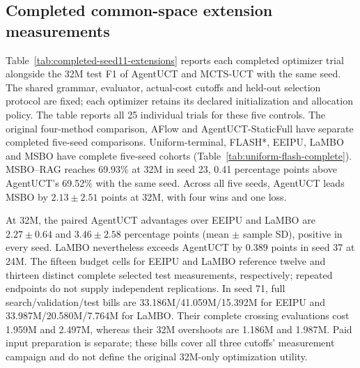 \subsection{Completed common-space extension measurements}
Table~\ref{tab:completed-seed11-extensions} reports each completed optimizer
trial alongside the 32M test F1 of AgentUCT and MCTS-UCT with the same seed.
The shared grammar, evaluator, actual-cost cutoffs and held-out selection
protocol are fixed; each optimizer retains its declared initialization and
allocation policy. The table reports all 25 individual trials for these five controls. The original four-method comparison, AFlow and
AgentUCT-StaticFull have separate completed five-seed comparisons.
Uniform-terminal, FLASH*, EEIPU, LaMBO and MSBO have complete five-seed cohorts
(Table~\ref{tab:uniform-flash-complete}).
MSBO--RAG reaches 69.93\% at 32M in seed 23, 0.41 percentage points above
AgentUCT's 69.52\% with the same seed. Across all five seeds, AgentUCT leads
MSBO by $2.13\pm2.51$ points at 32M, with four wins and one loss.

\begin{table}[t]
\centering\small
\caption{Completed common-space optimizer trials. F1 is primary test performance
in percent after Top5 validation selection. The AgentUCT and MCTS-UCT columns
show their same-seed 32M test F1 directly. $N_{32}$ and cost count complete evaluations and M weighted-token units
in the last affordable 32M snapshot. Each row is one trial; repeated endpoints
across budgets reuse measurements.}
\label{tab:completed-seed11-extensions}

\end{table}

\begin{table}[t]
\centering\small
\caption{Complete five-seed comparisons with five common-space sampling, surrogate and stage-allocation controls. Test F1 is directly compared with AgentUCT at each budget, as mean $\pm$ sample SD across five search seeds. Mean $N$ counts affordable complete evaluations for the listed method; budgets can reuse endpoints and are not independent replications.}
\label{tab:uniform-flash-complete}

\end{table}

At 32M, the paired AgentUCT advantages over EEIPU and LaMBO are
$2.27\pm0.64$ and $3.46\pm2.58$ percentage points (mean $\pm$ sample SD),
positive in every seed. LaMBO nevertheless exceeds AgentUCT by 0.389 points
in seed 37 at 24M. The fifteen budget cells for EEIPU and LaMBO reference
twelve and thirteen distinct complete selected test measurements,
respectively; repeated endpoints do not supply independent replications.
In seed 71, full search/validation/test bills are
33.186M/41.059M/15.392M for EEIPU and 33.987M/20.580M/7.764M for LaMBO.
Their complete crossing evaluations cost 1.959M and 2.497M, whereas their
32M overshoots are 1.186M and 1.987M. Paid input preparation is separate;
these bills cover all three cutoffs' measurement campaign and do not define
the original 32M-only optimization utility.

